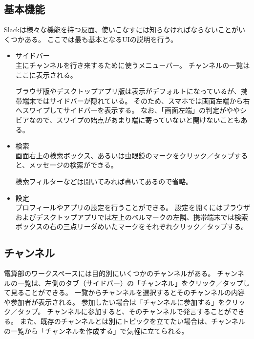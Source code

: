 \documentclass[lualatex,ja=standard,12pt,a4j]{bxjsbook}
\begin{document}
        	\subsection{基本機能}
            	Slackは様々な機能を持つ反面、使いこなすには知らなければならないことがいくつかある。
                ここでは最も基本となるUIの説明を行う。
                \begin{itemize}
                	\item サイドバー\\
                    	主にチャンネルを行き来するために使うメニューバー。
                        チャンネルの一覧はここに表示される。
                        
                        ブラウザ版やデスクトップアプリ版は表示がデフォルトになっているが、携帯端末ではサイドバーが隠れている。
                        そのため、スマホでは画面左端から右へスワイプしてサイドバーを表示する。
                        なお、「画面左端」の判定がややシビアなので、スワイプの始点があまり端に寄っていないと開けないこともある。
                    \item 検索\\
                    	画面右上の検索ボックス、あるいは虫眼鏡のマークをクリック／タップすると、メッセージの検索ができる。
                        
                        検索フィルターなどは開いてみれば書いてあるので省略。
                    \item 設定\\
                    	プロフィールやアプリの設定を行うことができる。
                        設定を開くにはブラウザおよびデスクトップアプリでは左上のベルマークの左隣、携帯端末では検索ボックスの右の三点リーダめいたマークをそれぞれクリック／タップする。
                \end{itemize}
            
            \subsection{チャンネル\label{channel}}
            	電算部のワークスペースには目的別にいくつかのチャンネルがある。
            	チャンネルの一覧は、左側のタブ（サイドバー）の「チャンネル」をクリック／タップして見ることができる。
            	一覧からチャンネルを選択するとそのチャンネルの内容や参加者が表示される。
            	参加したい場合は「チャンネルに参加する」をクリック／タップ。
            	チャンネルに参加すると、そのチャンネルで発言することができる。
            	また、既存のチャンネルとは別にトピックを立てたい場合は、チャンネルの一覧から「チャンネルを作成する」で気軽に立てられる。
            
\end{document}
